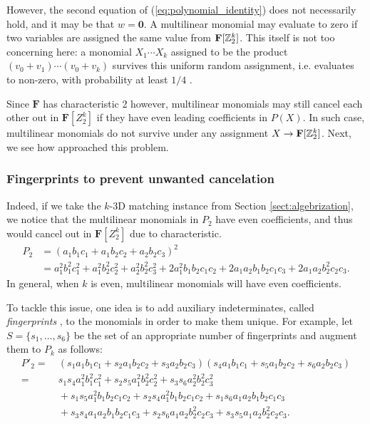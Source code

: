 However, the second equation of (\ref{eq:polynomial_identity}) 
does not necessarily hold, and it may be that $w = \mathbf{0}$. 
A multilinear monomial may evaluate to zero if two variables  
are assigned the same value from $\mathbf{F}[\mathbb Z_2^k]$. 
This itself is not too concerning here: 
a monomial $X_1 \cdots X_k$ assigned to be the product 
$(v_0 + v_1) \cdots (v_0 + v_k)$ survives this uniform random assignment, i.e. 
evaluates to non-zero, with probability at least $1/4$ \cite{Koutis08}.

Since $\mathbf{F}$ has characteristic 2 however, 
multilinear monomials may still cancel each other out 
in $\mathbf{F}[Z_2^k]$ if they have even leading 
coefficients in $P(X)$. In such case, multilinear monomials do not 
survive under any assignment $X \to \mathbf{F}[\mathbb Z_2^k]$. 
Next, we see how \citeauthor{Koutis08} approached this problem.

\subsubsection{Fingerprints to prevent unwanted cancelation}
\label{sect:fingerprints}

Indeed, if we take the $k$-3D matching instance from Section \ref{sect:algebrization}, 
we notice that the multilinear monomials in $P_2$ have even coefficients, and thus 
would cancel out in $\mathbf{F}[Z_2^k]$ due to characteristic.
\begin{align*}
  P_2 &= (a_1b_1c_1 + a_1b_2c_2 + a_2b_2c_3)^2  \\
  &= a_1^2b_1^2c_1^2 + a_1^2b_2^2c_2^2 + a_2^2b_2^2c_3^2 + 
  2a_1^2b_1b_2c_1c_2 + 2a_1a_2b_1b_2c_1c_3 + 2 a_1a_2b_2^2c_2c_3. 
\end{align*}
In general, when $k$ is even, multilinear monomials will have even coefficients. 

To tackle this issue, one idea is to add auxiliary indeterminates, 
called \emph{fingerprints} \cite{KouWil15}, to the monomials 
in order to make them unique. For example, let $S = \{s_1, \ldots, s_6\}$ 
be the set of an appropriate number of fingerprints 
and augment them to $P_k$ as follows: 
\begin{align*}
  P'_2 = &\:(s_1a_1b_1c_1 + s_2a_1b_2c_2 + s_3a_2b_2c_3)(s_4a_1b_1c_1 + s_5a_1b_2c_2 + s_6a_2b_2c_3) \\
  = &\:s_1s_4a_1^2b_1^2c_1^2 + s_2s_5a_1^2b_2^2c_2^2 + s_3s_6a_2^2b_2^2c_3^2 \: \\
  &\:+s_1s_5a_1^2b_1b_2c_1c_2 + s_2s_4a_1^2b_1b_2c_1c_2 + s_1s_6a_1a_2b_1b_2c_1c_3 \: \\
  &\:+s_3s_4a_1a_2b_1b_2c_1c_3 + s_2s_6a_1a_2b_2^2c_2c_3 + s_3s_5a_1a_2b_2^2c_2c_3. 
\end{align*}

